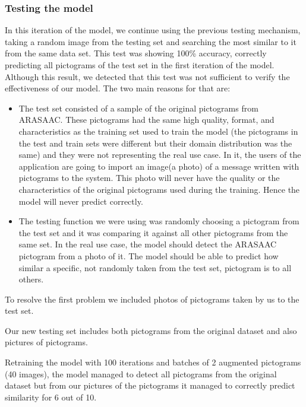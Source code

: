 \subsubsection{Testing the model}
In this iteration of the model, we continue using the previous testing mechanism, taking a random image from the testing set and searching the most similar to it from the same data set. This test was showing 100\% accuracy, correctly predicting all pictograms of the test set in the first iteration of the model. Although this result, we detected that this test was not sufficient to verify the effectiveness of our model. The two main reasons for that are:
\begin{itemize}
\item The test set consisted of a sample of the original pictograms from ARASAAC. These pictograms had the same high quality, format, and characteristics as the training set used to train the model (the pictograms in the test and train sets were different but their domain distribution was the same) and they were not representing the real use case. In it, the users of the application are going to import an image(a photo) of a message written with pictograms to the system. This photo will never have the quality or the characteristics of the original pictograms used during the training. Hence the model will never predict correctly.

\item The testing function we were using was randomly choosing a pictogram from the test set and it was comparing it against all other pictograms from the same set. In the real use case, the model should detect the ARASAAC pictogram from a photo of it. The model should be able to predict how similar a specific, not randomly taken from the test set, pictogram is to all others. 
\end{itemize}

To resolve the first problem we included photos of pictograms taken by us to the test set.

Our new testing set includes both pictograms from the original dataset and also pictures of pictograms. 

Retraining the model with 100 iterations and batches of 2 augmented pictograms (40 images), the model managed to detect all pictograms from the original dataset but from our pictures of the pictograms it managed to correctly predict similarity for 6 out of 10.



